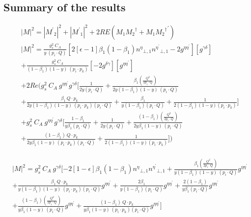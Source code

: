 \subsection{Summary of the results}

\begin{equation}
\begin{split}
&|M|^{2}=|{M^{\prime}}_2|^{2}+|{M^{\prime}}_1|^{2}+2RE(M_1{M_2}^{\dagger}+{M_1{M_2}^{\dagger}}^{\prime})\\
&{|{M}|}^2 =\frac{g_s^2\: C_A}{y\:(p_i\cdot Q)}[2[\epsilon-1]{\beta_1}(1-\beta_1){n^{{\eta}}}_{\bot,1}{n^{{\eta}^{\prime}}}_{\bot,1}-2g^{{\eta}{{\eta}^{\prime}}}][g^{{\gamma}{{\delta}}}]\\
&+\frac{g_s^2\: C_A}{(1-\beta_1) (1-y)\:(p_i \cdot p_k)}[-2g^{{\delta}{\gamma}}][g^{{\eta}{{\eta}^{\prime}}}]\\
&+2Re(g_s^2\: C_A\:g^{{{\eta}}{{\eta}^{\prime}}}g^{{{\gamma}}{{\delta}}}[\frac{1}{2y(p_i \cdot Q)}+\frac{\beta_1(\frac{Q^2}{2p_i \cdot Q})}{2y(1-\beta_1) (1-y)\:(p_i \cdot Q)}\\
&+\frac{\beta_1\:Q\cdot p_k}{2y(1-\beta_1) (1-y)\:(p_i \cdot p_k)(p_i \cdot Q)}+\frac{\beta_1}{y(1-\beta_1) (p_i \cdot Q)}+\frac{1}{2(1-\beta_1)(1-y) (p_i \cdot p_k)}]\\
&+g_s^2\: C_A\:g^{{{\eta}}{{\eta}^{\prime}}}g^{{{\gamma}}{{\delta}}}[\frac{1-\beta_1}{y\beta_1 (p_i \cdot Q)}+\frac{1}{2y(p_i \cdot Q)}+\frac{(1-\beta_1)(\frac{Q^2}{2p_i \cdot Q})}{2y\beta_1 (1-y)\:(p_i \cdot Q)}\\
&+\frac{(1-\beta_1)\:Q\cdot p_k}{2y\beta_1 (1-y)\:(p_i \cdot p_k)(p_i \cdot Q)}+\frac{1}{2(1-\beta_1)(1-y) (p_i \cdot p_k)}])  \\
\end{split}
\end{equation}


\begin{equation}
\begin{split}
&{|{M}|}^2 =g_s^2\: C_A\:g^{{{\gamma}}{{\delta}}}[-2[1-\epsilon]{\beta_1}(1-\beta_1){n^{{\eta}}}_{\bot,1}{n^{{\eta}^{\prime}}}_{\bot,1}+\frac{\beta_1(\frac{Q^2}{2p_i \cdot Q})}{y(1-\beta_1) (1-y)\:(p_i \cdot Q)}g^{{{\eta}}{{\eta}^{\prime}}}\\
&+\frac{\beta_1\:Q\cdot p_k}{y(1-\beta_1) (1-y)\:(p_i \cdot p_k)(p_i \cdot Q)}g^{{{\eta}}{{\eta}^{\prime}}}+\frac{2\beta_1}{y(1-\beta_1) (p_i \cdot Q)}g^{{{\eta}}{{\eta}^{\prime}}}+\frac{2(1-\beta_1)}{y\beta_1 (p_i \cdot Q)}g^{{{\eta}}{{\eta}^{\prime}}}\\
&+\frac{(1-\beta_1)(\frac{Q^2}{2p_i \cdot Q})}{y\beta_1 (1-y)\:(p_i \cdot Q)}g^{{{\eta}}{{\eta}^{\prime}}}+\frac{(1-\beta_1)\:Q\cdot p_k}{y\beta_1 (1-y)\:(p_i \cdot p_k)(p_i \cdot Q)}g^{{{\eta}}{{\eta}^{\prime}}}]  \\
\end{split}
\end{equation}


